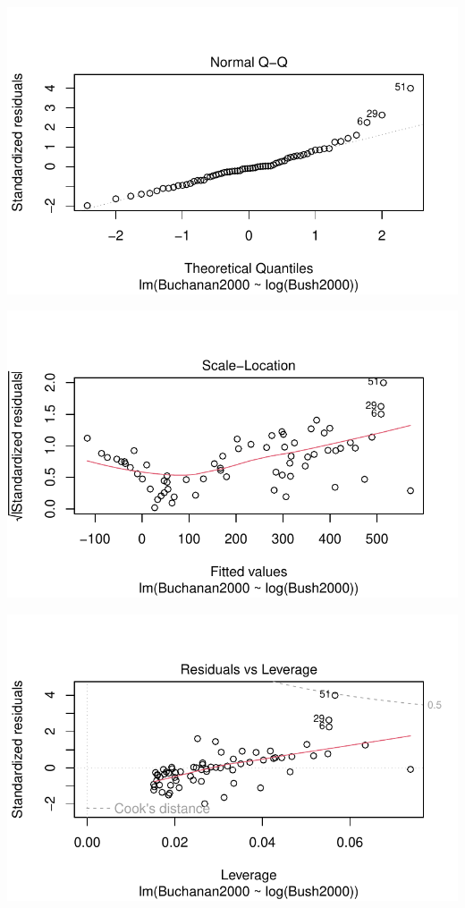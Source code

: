 \documentclass[
  letterpaper,
  DIV=11,
  numbers=noendperiod]{scrartcl}
\begin{document}
\includegraphics{case_study_1_files/figure-pdf/unnamed-chunk-3-8.pdf}

\includegraphics{case_study_1_files/figure-pdf/unnamed-chunk-3-9.pdf}

\includegraphics{case_study_1_files/figure-pdf/unnamed-chunk-3-10.pdf}
\end{document}

